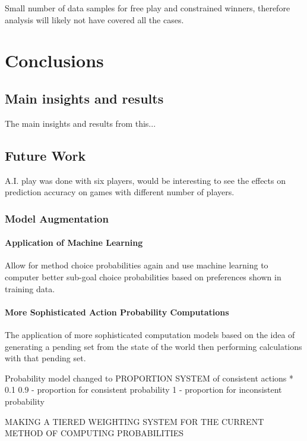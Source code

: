 \documentclass[parskip]{cs4rep}
\begin{document}
Small number of data samples for free play and constrained winners, therefore analysis will likely not have covered all the cases.

\chapter{Conclusions}

\section{Main insights and results}

The main insights and results from this...

\section{Future Work}

A.I. play was done with six players, would be interesting to see the effects on prediction accuracy on games with different number of players.

\subsection{Model Augmentation}

\subsubsection{Application of Machine Learning}

Allow for method choice probabilities again and use machine learning to computer better sub-goal choice probabilities based on preferences shown in training data.

\subsubsection{More Sophisticated Action Probability Computations}

The application of more sophisticated computation models based on the idea of generating a pending set from the state of the world then performing calculations with that pending set.

Probability model changed to PROPORTION SYSTEM of consistent actions * 0.1 
0.9 - proportion for consistent probability
1 - proportion for inconsistent probability

MAKING A TIERED WEIGHTING SYSTEM FOR THE CURRENT METHOD OF COMPUTING PROBABILITIES
\end{document}
